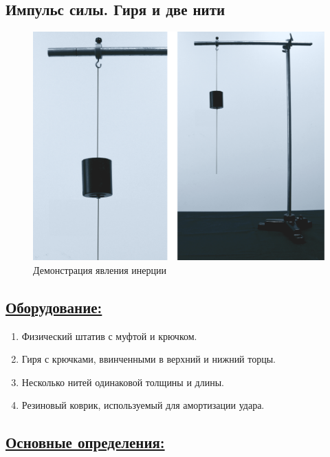 \documentclass[14pt,a4paper,oneside]{extarticle}	%
\begin{document}

\begin{center}
	\subsection*{Импульс силы. Гиря и две нити}
\end{center}

\begin{figure}[H] 	%
	\centering 		%
	\includegraphics[width=0.8\linewidth]{inertia-2.png}
	\caption{Демонстрация явления инерции}
\end{figure}

\subsection*{\underline{Оборудование:}}

\begin{enumerate}
	\item Физический штатив с муфтой и крючком.
	\item Гиря с крючками, ввинченными в верхний и нижний торцы.
	\item Несколько нитей одинаковой толщины и длины.
	\item Резиновый коврик, используемый для амортизации удара.
\end{enumerate}

\subsection*{\underline{Основные определения:}}
\end{document}
